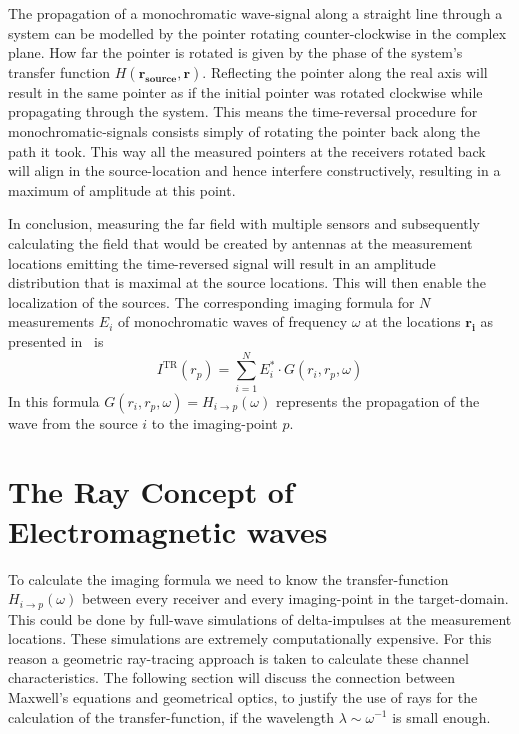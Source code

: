 The propagation of a monochromatic wave-signal along a straight line through a system can be modelled by the pointer rotating counter-clockwise in the complex plane.
How far the pointer is rotated is given by the phase of the system's transfer function \(H(\mathbf{r_{source}}, \mathbf{r})\).
Reflecting the pointer along the real axis will result in the same pointer as if the initial pointer was rotated clockwise while propagating through the system.
This means the time-reversal procedure for monochromatic-signals consists simply of rotating the pointer back along the path it took.
This way all the measured pointers at the receivers rotated back will align in the source-location and hence interfere constructively, resulting in a maximum of amplitude at this point.  

\vspace{1cm}
In conclusion, measuring the far field with multiple sensors and subsequently calculating the field that would be created by antennas at the measurement locations emitting the time-reversed signal will result in an amplitude distribution that is maximal at the source locations.
This will then enable the localization of the sources. 
The corresponding imaging formula for \(N\) measurements \(E_i\) of monochromatic waves of frequency \(\omega \) at the locations \(\mathbf{r_i}\) as presented in~\parencite{peng_zhang_comparison_2013} is
\begin{equation}
    I^{\mathrm{TR}}\left(r_p\right)=\sum_{i=1}^N E_{i}^* \cdot G\left(r_i, r_p, \omega\right)
\end{equation}
In this formula \(G(r_i, r_p, \omega) = H_{i\rightarrow p}(\omega)\) represents the propagation of the wave from the source \(i\) to the imaging-point \(p\).



\section{The Ray Concept of Electromagnetic waves}
To calculate the imaging formula we need to know the transfer-function \(H_{i\rightarrow p}(\omega)\) between every receiver and every imaging-point in the target-domain.
This could be done by full-wave simulations of delta-impulses at the measurement locations.
These simulations are extremely computationally expensive.
For this reason a geometric ray-tracing approach is taken to calculate these channel characteristics.
The following section will discuss the connection between Maxwell's equations and geometrical optics, to justify the use of rays for the calculation of the transfer-function, if the wavelength \(\lambda \sim \omega^{-1} \) is small enough.

